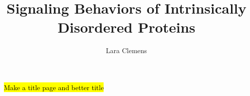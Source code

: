 \documentclass[onecolumn]{article}
\begin{document}
\title{Signaling Behaviors of Intrinsically Disordered Proteins}
\author{Lara Clemens}
\date{}

\maketitle

\hl{Make a title page and better title}
\newpage

\tableofcontents

\newpage



%





\graphicspath{{ModelDevelopment/}}



\graphicspath{{Results/GeneralStiffElectro/}}



\graphicspath{{Results/SimultaneousBinding/}}



\graphicspath{{Results/SurfaceEffects/}}



\graphicspath{{Timeline/}}



\graphicspath{{Appendix/}}



\printbibliography



\end{document}
